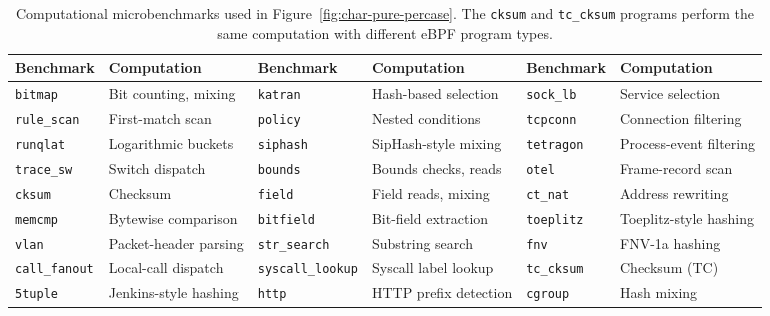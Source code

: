 \begin{table}[t]
\centering
\small
\caption{Computational microbenchmarks used in Figure~\ref{fig:char-pure-percase}. The \texttt{cksum} and \texttt{tc\_cksum} programs perform the same computation with different eBPF program types.}
\label{tab:microbenchmarks}
\renewcommand{\arraystretch}{1.08}
\begin{tabular*}{\textwidth}{@{\extracolsep{\fill}}ll@{\hspace{1.2em}}ll@{\hspace{1.2em}}ll@{}}
\toprule
\textbf{Benchmark} & \textbf{Computation} & \textbf{Benchmark} & \textbf{Computation} & \textbf{Benchmark} & \textbf{Computation} \\
\midrule
\texttt{bitmap} & Bit counting, mixing & \texttt{katran} & Hash-based selection & \texttt{sock\_lb} & Service selection \\
\texttt{rule\_scan} & First-match scan & \texttt{policy} & Nested conditions & \texttt{tcpconn} & Connection filtering \\
\texttt{runqlat} & Logarithmic buckets & \texttt{siphash} & SipHash-style mixing & \texttt{tetragon} & Process-event filtering \\
\texttt{trace\_sw} & Switch dispatch & \texttt{bounds} & Bounds checks, reads & \texttt{otel} & Frame-record scan \\
\texttt{cksum} & Checksum & \texttt{field} & Field reads, mixing & \texttt{ct\_nat} & Address rewriting \\
\texttt{memcmp} & Bytewise comparison & \texttt{bitfield} & Bit-field extraction & \texttt{toeplitz} & Toeplitz-style hashing \\
\texttt{vlan} & Packet-header parsing & \texttt{str\_search} & Substring search & \texttt{fnv} & FNV-1a hashing \\
\texttt{call\_fanout} & Local-call dispatch & \texttt{syscall\_lookup} & Syscall label lookup & \texttt{tc\_cksum} & Checksum (TC) \\
\texttt{5tuple} & Jenkins-style hashing & \texttt{http} & HTTP prefix detection & \texttt{cgroup} & Hash mixing \\
\bottomrule
\end{tabular*}
\end{table}
